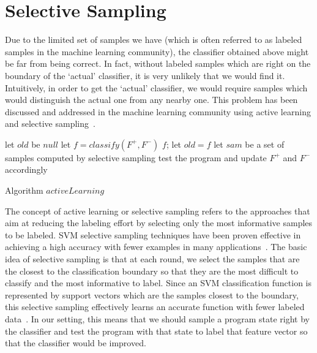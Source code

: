 
\section{Selective Sampling}
Due to the limited set of samples we have (which is often referred to as labeled samples in the machine learning community), the classifier obtained above might be far from being correct. In fact, without labeled samples which are right on the boundary of the `actual' classifier, it is very unlikely that we would find it. Intuitively, in order to get the `actual' classifier, we would require samples which would distinguish the actual one from any nearby one. This problem has been discussed and addressed in the machine learning community using active learning and selective sampling~\cite{DBLP:conf/icml/SchohnC00}.

\begin{algorithm}[t]
\SetAlgoVlined
\Indm
{}
\Indp
let $old$ be $null$\;
 {
    let $f = classify(F^+, F^-)$\;
     {
        \Return $f$;
    }
    let $old = f$\;
    let $sam$ be a set of samples computed by selective sampling\;
    test the program and update $F^+$ and $F^-$ accordingly\;
}
\caption{Algorithm $activeLearning$}
\label{alg:active}
\end{algorithm}

The concept of active learning or selective sampling refers to the approaches that aim at reducing the labeling effort by selecting only the most informative samples to be labeled. SVM selective sampling techniques have been proven effective in achieving a high accuracy with fewer examples in many applications~\cite{DBLP:conf/mm/TongC01,DBLP:journals/jmlr/TongK01}. The basic idea of  selective sampling is that at each round, we select the samples that are the closest to the classification boundary so that they are the most difficult to classify and the most informative to label. Since an SVM classification function is represented by support vectors which are the samples closest to the boundary, this selective sampling effectively learns an accurate function with fewer labeled data~\cite{DBLP:conf/icml/SchohnC00}. In our setting, this means that we should sample a program state right by the classifier and test the program with that state to label that feature vector so that the classifier would be improved.

